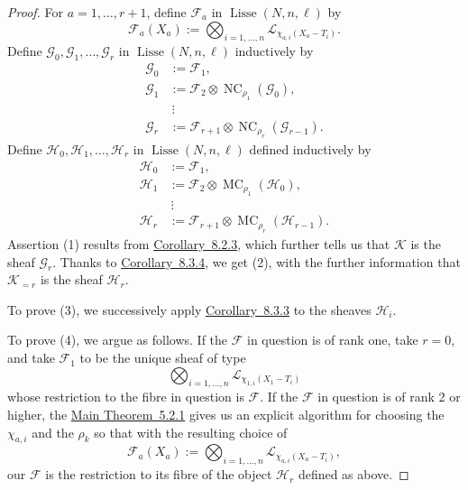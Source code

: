 \begin{proof}
For \(a=1,\ldots,r+1\), define \(\mathcal{F}_a\) in \(\operatorname{Lisse}(N,n,\ell)\) by
\[
\mathcal{F}_a(X_a):=\bigotimes_{i=1,\ldots,n}\mathcal{L}_{\chi_{a,i}(X_a-T_i)}.
\]
Define \(\mathcal{G}_0,\mathcal{G}_1,\ldots,\mathcal{G}_r\) in \(\operatorname{Lisse}(N,n,\ell)\) inductively by
\[
\begin{aligned}
\mathcal{G}_0&:=\mathcal{F}_1,\\
\mathcal{G}_1&:=\mathcal{F}_2\otimes\operatorname{NC}_{\rho_1}(\mathcal{G}_0),\\
&\ \vdots\\
\mathcal{G}_r&:=\mathcal{F}_{r+1}\otimes\operatorname{NC}_{\rho_r}(\mathcal{G}_{r-1}).
\end{aligned}
\]
Define \(\mathcal{H}_0,\mathcal{H}_1,\ldots,\mathcal{H}_r\) in \(\operatorname{Lisse}(N,n,\ell)\) defined inductively by
\[
\begin{aligned}
\mathcal{H}_0&:=\mathcal{F}_1,\\
\mathcal{H}_1&:=\mathcal{F}_2\otimes\operatorname{MC}_{\rho_1}(\mathcal{H}_0),\\
&\ \vdots\\
\mathcal{H}_r&:=\mathcal{F}_{r+1}\otimes\operatorname{MC}_{\rho_r}(\mathcal{H}_{r-1}).
\end{aligned}
\]
Assertion (1) results from \hyperref[cor:8.2.3]{Corollary~8.2.3}, which further tells us that \(\mathcal{K}\) is the sheaf \(\mathcal{G}_r\). Thanks to \hyperref[cor:8.3.4]{Corollary~8.3.4}, we get (2), with the further information that \(\mathcal{K}_{=r}\) is the sheaf \(\mathcal{H}_r\).

To prove (3), we successively apply \hyperref[cor:8.3.3]{Corollary~8.3.3} to the sheaves \(\mathcal{H}_i\).

To prove (4), we argue as follows. If the \(\mathcal{F}\) in question is of rank one, take \(r=0\), and take \(\mathcal{F}_1\) to be the unique sheaf of type
\[
\bigotimes_{i=1,\ldots,n}\mathcal{L}_{\chi_{1,i}(X_1-T_i)}
\]
whose restriction to the fibre in question is \(\mathcal{F}\). If the \(\mathcal{F}\) in question is of rank 2 or higher, the \hyperref[thm:5.2.1]{Main Theorem~5.2.1} gives us an explicit algorithm for choosing the \(\chi_{a,i}\) and the \(\rho_k\) so that with the resulting choice of
\[
\mathcal{F}_a(X_a):=\bigotimes_{i=1,\ldots,n}\mathcal{L}_{\chi_{a,i}(X_a-T_i)},
\]
our \(\mathcal{F}\) is the restriction to its fibre of the object \(\mathcal{H}_r\) defined as above.
\end{proof}

